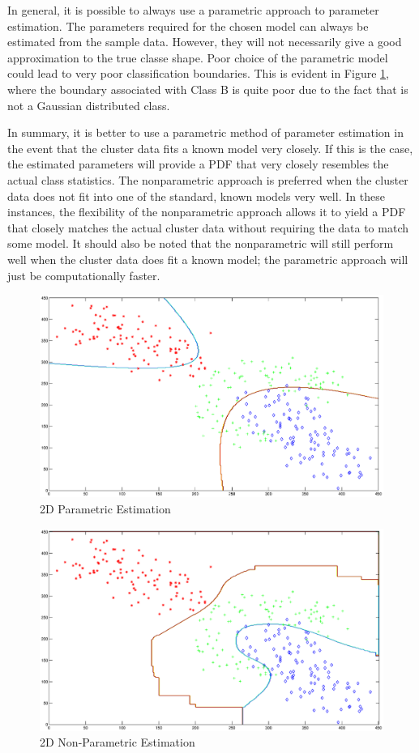 In general, it is possible to always use a parametric approach to parameter
estimation.  The parameters required for the chosen model can always be
estimated from the sample data.  However, they will not necessarily give a good
approximation to the true classe shape.  Poor choice of the parametric model
could lead to very poor classification boundaries.  This is evident in Figure
\ref{fig:twod-par}, where the boundary associated with Class B is quite poor due to the
fact that is not a Gaussian distributed class.

In summary, it is better to use a parametric method of parameter estimation in
the event that the cluster data fits a known model very closely.  If this is
the case, the estimated parameters will provide a PDF that very closely
resembles the actual class statistics.  The nonparametric approach is preferred
when the cluster data does not fit into one of the standard, known models very
well.  In these instances, the flexibility of the nonparametric approach allows
it to yield a PDF that closely matches the actual cluster data without
requiring the data to match some model.  It should also be noted that the
nonparametric will still perform well when the cluster data does fit a known
model; the parametric approach will just be computationally faster.

\begin{figure}
\includegraphics[scale=0.4]{twod-par}
\caption{2D Parametric Estimation}
\label{fig:twod-par}
\end{figure}

\begin{figure}
\includegraphics[scale=0.4]{twod-nonpar}
\caption{2D Non-Parametric Estimation}
\label{fig:twod-nonpar}
\end{figure}